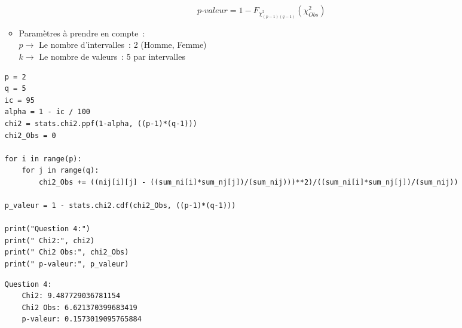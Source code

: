 \begin{enumerate}
\begin{itemize}
            \begin{equation}
                \textit{p-valeur} = 1 - F_{\chi^{2}_{(p-1)(q-1)}}(\chi^{2}_{Obs})
            \end{equation}
        
        \item Paramètres à prendre en compte~: \\
            \hspace*{1cm}$p \to$ Le nombre d'intervalles~: 2 (Homme, Femme) \\
            \hspace*{1cm}$k \to$ Le nombre de valeurs~: 5 par intervalles

        
    \end{itemize}
        \vspace{.2cm}

\begin{lstlisting}[style=myPython, caption=Code Python question 4, frame=lines]
p = 2  
q = 5  
ic = 95
alpha = 1 - ic / 100
chi2 = stats.chi2.ppf(1-alpha, ((p-1)*(q-1)))
chi2_Obs = 0

for i in range(p):
    for j in range(q):
        chi2_Obs += ((nij[i][j] - ((sum_ni[i]*sum_nj[j])/(sum_nij)))**2)/((sum_ni[i]*sum_nj[j])/(sum_nij))

p_valeur = 1 - stats.chi2.cdf(chi2_Obs, ((p-1)*(q-1)))

print("Question 4:")
print(" Chi2:", chi2)
print(" Chi2 Obs:", chi2_Obs)
print(" p-valeur:", p_valeur)
\end{lstlisting}

\begin{lstlisting}[style=myLog, caption=Résultat du code, frame=lines]
Question 4:
    Chi2: 9.487729036781154
    Chi2 Obs: 6.621370399683419
    p-valeur: 0.1573019095765884
\end{lstlisting}



\end{enumerate}
